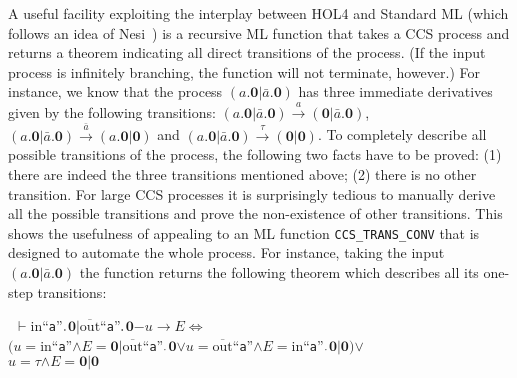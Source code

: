 \documentclass[GCNS]{yincog}
\renewcommand{\HOLConst}[1]{\texttt{#1}}
\renewcommand{\HOLStringLit}[1]{\textrm{``#1''}}
\renewcommand{\HOLFreeVar}[1]{\ensuremath{\mathit{#1}}}
\renewcommand{\HOLSymConst}[1]{#1}
\renewcommand{\HOLTokenConj}{\ensuremath{\wedge}}
\renewcommand{\HOLTokenEquiv}{\ensuremath{\Longleftrightarrow}}
\renewcommand{\HOLTokenTurnstile}{\ensuremath{\:\:\vdash}}
\renewcommand{\HOLTokenDisj}{\ensuremath{\vee}}
\theoremstyle{remark}
\theoremstyle{theorem}
\theoremstyle{remark}
\newcommand{\HOLTokenTransBegin}{$-$}
\newcommand{\HOLTokenTransEnd}{$\rightarrow$\xspace}
\newcommand{\HOLTokenInputAct}{$\mathrm{in}$}
\newcommand{\HOLTokenOutputAct}{$\overline{\mathrm{out}}$}
\def\nil{{\boldsymbol 0}}
\begin{document}
A useful facility exploiting the interplay between HOL4 and Standard ML
(which follows an idea of Nesi~\cite{Nesi:1992ve}) is a recursive ML function
that takes a CCS process and returns a theorem indicating all direct transitions
of the process. (If the input process is infinitely branching, the function
will not terminate, however.) For instance, we know that the process
$(a.\nil | \bar{a}.\nil )$ has three immediate derivatives given by the
following transitions:
$(a.\nil | \bar{a}.\nil ) \overset{a}{\longrightarrow} (\nil |
\bar{a}.\nil )$,
$(a.\nil | \bar{a}.\nil ) \overset{\bar{a}}{\longrightarrow} (a.\nil |
\nil )$ and
$(a.\nil | \bar{a}.\nil ) \overset{\tau}{\longrightarrow} (\nil |
\nil )$. To completely describe all possible transitions of the process,
the following two facts have to be proved: (1) there are indeed the three
transitions mentioned above; (2) there is no other transition. For large
CCS processes it is surprisingly tedious to manually derive all the possible
transitions and prove the non-existence of other transitions. This shows
the usefulness of appealing to an ML function
\texttt{CCS\_TRANS\_CONV} that is designed to automate the whole process.
For instance, taking the input $(a.\nil | \bar{a}.\nil )$ the function
returns the following theorem which describes all its one-step transitions:
%
\begin{alltt}
\HOLTokenTurnstile{} \HOLConst{\HOLTokenInputAct} \HOLStringLit{a}\HOLSymConst{\ensuremath{\ldotp}}\HOLConst{\ensuremath{\mathbf{0}}} \HOLSymConst{\ensuremath{\mid}} \HOLConst{\HOLTokenOutputAct} \HOLStringLit{a}\HOLSymConst{\ensuremath{\ldotp}}\HOLConst{\ensuremath{\mathbf{0}}} \HOLTokenTransBegin\HOLFreeVar{u}\HOLTokenTransEnd \HOLFreeVar{E} \HOLSymConst{\HOLTokenEquiv{}}
   \ensuremath{(}\HOLFreeVar{u} \HOLSymConst{\ensuremath{=}} \HOLConst{\HOLTokenInputAct} \HOLStringLit{a} \HOLSymConst{\HOLTokenConj{}} \HOLFreeVar{E} \HOLSymConst{\ensuremath{=}} \HOLConst{\ensuremath{\mathbf{0}}} \HOLSymConst{\ensuremath{\mid}} \HOLConst{\HOLTokenOutputAct} \HOLStringLit{a}\HOLSymConst{\ensuremath{\ldotp}}\HOLConst{\ensuremath{\mathbf{0}}} \HOLSymConst{\HOLTokenDisj{}} \HOLFreeVar{u} \HOLSymConst{\ensuremath{=}} \HOLConst{\HOLTokenOutputAct} \HOLStringLit{a} \HOLSymConst{\HOLTokenConj{}} \HOLFreeVar{E} \HOLSymConst{\ensuremath{=}} \HOLConst{\HOLTokenInputAct} \HOLStringLit{a}\HOLSymConst{\ensuremath{\ldotp}}\HOLConst{\ensuremath{\mathbf{0}}} \HOLSymConst{\ensuremath{\mid}} \HOLConst{\ensuremath{\mathbf{0}}}\ensuremath{)} \HOLSymConst{\HOLTokenDisj{}}
   \HOLFreeVar{u} \HOLSymConst{\ensuremath{=}} \HOLSymConst{\ensuremath{\tau}} \HOLSymConst{\HOLTokenConj{}} \HOLFreeVar{E} \HOLSymConst{\ensuremath{=}} \HOLConst{\ensuremath{\mathbf{0}}} \HOLSymConst{\ensuremath{\mid}} \HOLConst{\ensuremath{\mathbf{0}}}
\end{alltt}
\end{document}
